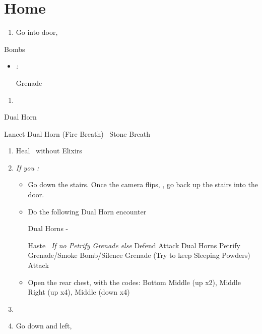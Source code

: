 \chapter{Home}

\begin{enumerate}
  \item Go into door, \sd
\end{enumerate}
\begin{battle}{Bombs}
  \begin{itemize}
    \tidusf Haste \tidus
    \tidusf Attach each, starting with Guado
    \auronf Attack Guado didn't die to \tidus
    \item \textit{\blitzloss:}
    \begin{itemize}
    \rikkuf Grenade
    \end{itemize}
  \end{itemize}
\end{battle}
\begin{enumerate}[resume]
  \item \sd
\end{enumerate}
\begin{battle}{Dual Horn}
  \begin{itemize}
    \kimahrif Lancet Dual Horn (Fire Breath)
    \kimahrif \od\ Stone Breath
  \end{itemize}
\end{battle}
\begin{enumerate}[resume]
  \item Heal \tidus\ without Elixirs
  \item \textit{If you \lostblitz:}
        \begin{itemize}
          \item Go down the stairs. Once the camera flips, \formation{\tidus}{\rikku}{\auron}, go back up the stairs into the door.
          \item Do the following Dual Horn encounter
                \begin{battle}{Dual Horns - \blitzloss}
                  \begin{itemize}
                    \tidusf Haste \tidus\ \textit{If no Petrify Grenade else } Defend
                    \tidusf Attack Dual Horns
                     Petrify Grenade/Smoke Bomb/Silence Grenade (Try to keep Sleeping Powders)
                    \tidusf Attack
                  \end{itemize}
                \end{battle}
          \item Open the rear chest, with the codes: Bottom Middle (up x2), Middle Right (up x4), Middle (down x4) %
        \end{itemize}
  \item \formation{\tidus}{\lulu}{\auron}
  \item Go down and left, \cs[0:50]
\end{enumerate}
